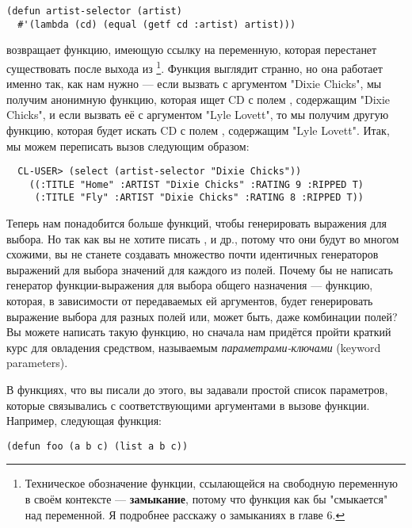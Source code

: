 \begin{lstlisting}
(defun artist-selector (artist)
  #'(lambda (cd) (equal (getf cd :artist) artist)))
\end{lstlisting}

 возвращает функцию, имеющую ссылку на переменную, которая
перестанет существовать после выхода из \footnote{Техническое
  обозначение функции, ссылающейся на свободную переменную в своём контексте ---
  \textbf{замыкание}, потому что функция как бы "смыкается" над переменной. Я подробнее
  расскажу о замыканиях в главе 6.}. Функция выглядит странно, но она работает именно так,
как нам нужно --- если вызвать  с аргументом "Dixie Chicks", мы
получим анонимную функцию, которая ищет CD с полем , содержащим "Dixie
Chicks", и если вызвать её с аргументом "Lyle Lovett", то мы получим другую функцию,
которая будет искать CD с полем , содержащим "Lyle Lovett". Итак, мы можем
переписать вызов  следующим образом:

\begin{verbatim}
  CL-USER> (select (artist-selector "Dixie Chicks"))
    ((:TITLE "Home" :ARTIST "Dixie Chicks" :RATING 9 :RIPPED T)
     (:TITLE "Fly" :ARTIST "Dixie Chicks" :RATING 8 :RIPPED T))
\end{verbatim}

Теперь нам понадобится больше функций, чтобы генерировать выражения для выбора. Но так как
вы не хотите писать ,  и др., потому что они
будут во многом схожими, вы не станете создавать множество почти идентичных генераторов
выражений для выбора значений для каждого из полей. Почему бы не написать генератор
функции-выражения для выбора общего назначения --- функцию, которая, в зависимости от
передаваемых ей аргументов, будет генерировать выражение выбора для разных полей или,
может быть, даже комбинации полей? Вы можете написать такую функцию, но сначала нам
придётся пройти краткий курс для овладения средством, называемым
\textit{параметрами-ключами} (keyword parameters).

В функциях, что вы писали до этого, вы задавали простой список параметров, которые
связывались с соответствующими аргументами в вызове функции. Например, следующая функция:

\begin{lstlisting}
(defun foo (a b c) (list a b c))
\end{lstlisting}

